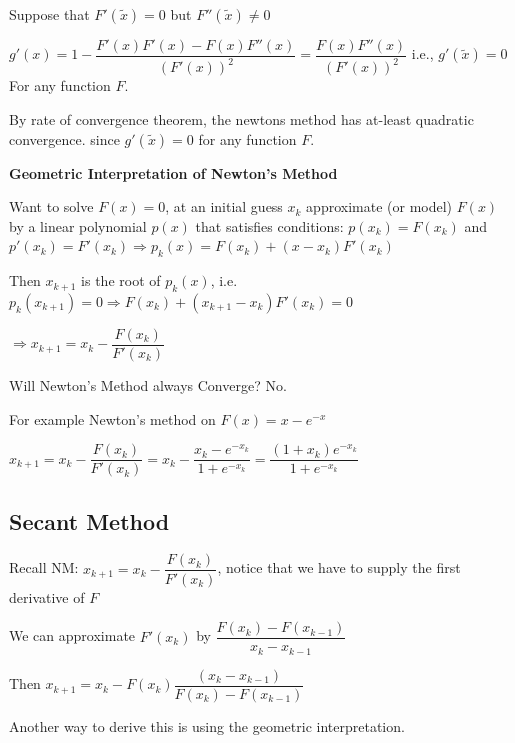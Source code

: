 \documentclass{article}
\begin{document}
Suppose that $F'(\tilde{x}) = 0$ but $F''(\tilde{x}) \neq 0$

\vspace{0.2cm}

$g'(x) = 1 - \dfrac{F'(x) F'(x) - F(x) F''(x)}{(F'(x))^2} = \dfrac{F(x)F''(x)}{(F'(x))^2}$ i.e., $g'(\tilde{x}) = 0$ For any function $F$.

By rate of convergence theorem, the newtons method has at-least quadratic convergence. since $g'(\tilde{x}) = 0$ for any function $F$. 

\vspace{0.2cm}

\textbf{Geometric Interpretation of Newton's Method}

Want to solve $F(x) = 0$, at an initial guess $x_k$ approximate (or model) $F(x)$ by a linear polynomial $p(x)$ that satisfies conditions: $p(x_k) = F(x_k)$ and $p'(x_k) = F'(x_k) \Rightarrow p_k(x) = F(x_k) + (x - x_k) F'(x_k)$

\vspace{0.2cm}
 
Then $x_{k + 1}$ is the root of $p_k(x)$, i.e. $p_k(x_{k + 1}) = 0 \Rightarrow F(x_k) + (x_{k + 1} - x_k)F'(x_k) = 0 $

\hspace{2cm} $\Rightarrow x_{k + 1} = x_k - \dfrac{F(x_k)}{F'(x_k)}$

\vspace{0.2cm}

Will Newton's Method always Converge? No. 

For example Newton's method on $F(x) = x - e^{-x}$

$x_{k + 1} = x_k - \dfrac{F(x_k)}{F'(x_k)} = x_k - \dfrac{x_k - e^{-x_k}}{1 + e^{-x_k}} = \dfrac{(1 + x_k)e^{-x_k}}{1 + e^{-x_k}}$

\subsection{Secant Method}

Recall NM: $x_{k + 1} = x_k - \dfrac{F(x_k)}{F'(x_k)}$, notice that we have to supply the first derivative of $F$

\text{}

We can approximate $F'(x_k)$ by $\dfrac{F(x_k) - F(x_{k - 1})}{x_k - x_{k - 1}}$

Then $x_{k + 1} = x_k - F(x_k) \dfrac{(x_k - x_{k - 1})}{F(x_k) - F(x_{k - 1})}$

Another way to derive this is using the geometric interpretation.
\end{document}

